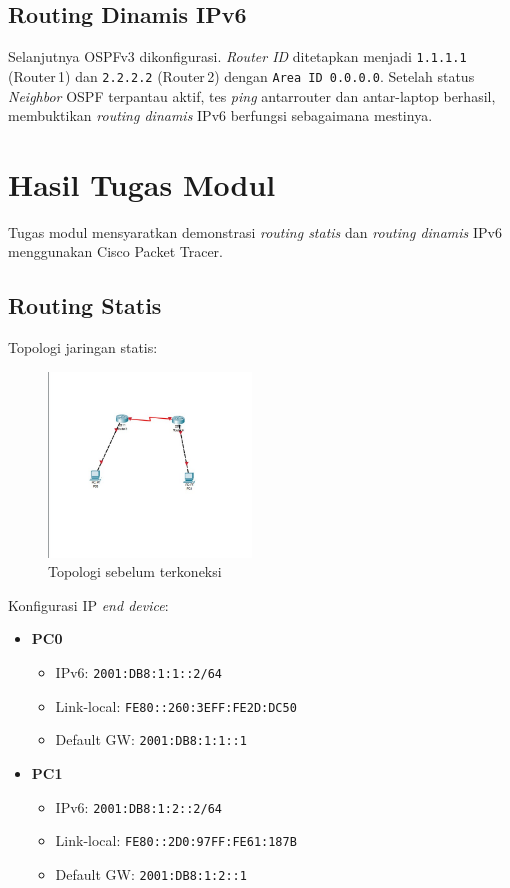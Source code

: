 \subsection{Routing Dinamis IPv6}

Selanjutnya OSPFv3 dikonfigurasi. \textit{Router ID} ditetapkan menjadi \texttt{1.1.1.1} (Router\,1) dan \texttt{2.2.2.2} (Router\,2) dengan \texttt{Area ID 0.0.0.0}. Setelah status \textit{Neighbor} OSPF terpantau aktif, tes \textit{ping} antarr­outer dan antar-laptop berhasil, membuktikan \textit{routing dinamis} IPv6 berfungsi sebagaimana mestinya.

\newpage
\section{Hasil Tugas Modul}

Tugas modul mensyaratkan demonstrasi \textit{routing statis} dan \textit{routing dinamis} IPv6 menggunakan Cisco Packet Tracer.

\subsection{Routing Statis}

Topologi jaringan statis:

\begin{figure}[H]
    \centering
    \includegraphics[width=0.48\textwidth]{img/TM1.jpeg}
    \caption{Topologi sebelum terkoneksi}
    \label{fig:tm1}
\end{figure}

Konfigurasi IP \textit{end device}:
\begin{itemize}
    \item \textbf{PC0}
        \begin{itemize}
            \item IPv6: \texttt{2001:DB8:1:1::2/64}
            \item Link-local: \texttt{FE80::260:3EFF:FE2D:DC50}
            \item Default GW: \texttt{2001:DB8:1:1::1}
        \end{itemize}
    \item \textbf{PC1}
        \begin{itemize}
            \item IPv6: \texttt{2001:DB8:1:2::2/64}
            \item Link-local: \texttt{FE80::2D0:97FF:FE61:187B}
            \item Default GW: \texttt{2001:DB8:1:2::1}
        \end{itemize}
\end{itemize}

